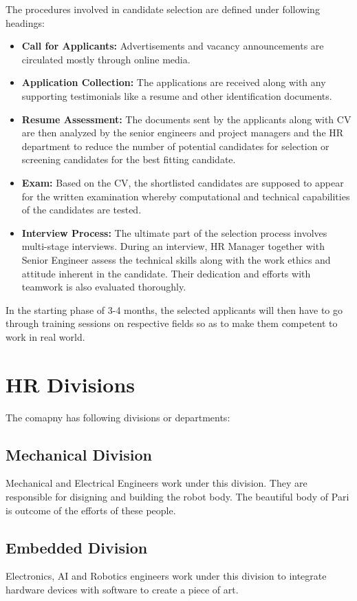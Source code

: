 \documentclass[12pt,a4paper]{scrreprt}
\begin{document}
The procedures involved in candidate selection are defined under following headings:
	\begin{itemize}
		\item \textbf{Call for Applicants:} Advertisements and vacancy announcements are circulated mostly through online media.
		\item \textbf{Application Collection:} The applications are received along with any supporting testimonials like a resume and other identification documents.
		\item \textbf{Resume Assessment:} The documents sent by the applicants along with CV are then analyzed by the senior engineers and project managers and the HR department to reduce the number of potential candidates for selection or screening candidates for the best fitting candidate.
		\item \textbf{Exam:} Based on the CV, the shortlisted candidates are supposed to appear for the written examination whereby computational and technical capabilities of the
candidates are tested.
		\item \textbf{Interview Process:} The ultimate part of the selection process involves multi-stage interviews. During an interview, HR Manager together with Senior Engineer assess
the technical skills along with the work ethics and attitude inherent in the candidate. Their dedication and efforts with teamwork is also evaluated thoroughly.
	\end{itemize}

In the starting phase of 3-4 months, the selected applicants will then have to go through
training sessions on respective fields so as to make them competent to work in real world.
\section{HR Divisions}
The comapny has following divisions or departments:
\subsection{Mechanical Division}
Mechanical and Electrical Engineers work under this division. They are responsible for disigning and building the robot body. The beautiful body of Pari is outcome of the efforts of these people.

\subsection{Embedded Division}
Electronics, AI and Robotics engineers work under this division to integrate hardware devices with software to create a piece of art.
\end{document}
